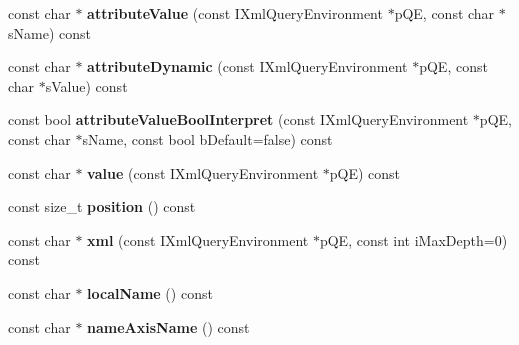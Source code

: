 \begin{DoxyCompactItemize}
\item 
\hypertarget{classgeneral__server_1_1LibXmlBaseNode_a217425847995b514cf153bb48d86d382}{const char $\ast$ {\bfseries attribute\-Value} (const \-I\-Xml\-Query\-Environment $\ast$p\-Q\-E, const char $\ast$s\-Name) const }\label{classgeneral__server_1_1LibXmlBaseNode_a217425847995b514cf153bb48d86d382}

\item 
\hypertarget{classgeneral__server_1_1LibXmlBaseNode_a3825430d31df67a1757812f67c14428a}{const char $\ast$ {\bfseries attribute\-Dynamic} (const \-I\-Xml\-Query\-Environment $\ast$p\-Q\-E, const char $\ast$s\-Value) const }\label{classgeneral__server_1_1LibXmlBaseNode_a3825430d31df67a1757812f67c14428a}

\item 
\hypertarget{classgeneral__server_1_1LibXmlBaseNode_abe06748d4d3333fcbc67fc84e2c77b42}{const bool {\bfseries attribute\-Value\-Bool\-Interpret} (const \-I\-Xml\-Query\-Environment $\ast$p\-Q\-E, const char $\ast$s\-Name, const bool b\-Default=false) const }\label{classgeneral__server_1_1LibXmlBaseNode_abe06748d4d3333fcbc67fc84e2c77b42}

\item 
\hypertarget{classgeneral__server_1_1LibXmlBaseNode_a650ea438a5ca28feca980629f80c4101}{const char $\ast$ {\bfseries value} (const \-I\-Xml\-Query\-Environment $\ast$p\-Q\-E) const }\label{classgeneral__server_1_1LibXmlBaseNode_a650ea438a5ca28feca980629f80c4101}

\item 
\hypertarget{classgeneral__server_1_1LibXmlBaseNode_ae01425edaa378fa7045f8fb9c273f398}{const size\-\_\-t {\bfseries position} () const }\label{classgeneral__server_1_1LibXmlBaseNode_ae01425edaa378fa7045f8fb9c273f398}

\item 
\hypertarget{classgeneral__server_1_1LibXmlBaseNode_ab29b3973a907e524ec705139fb0ecbce}{const char $\ast$ {\bfseries xml} (const \-I\-Xml\-Query\-Environment $\ast$p\-Q\-E, const int i\-Max\-Depth=0) const }\label{classgeneral__server_1_1LibXmlBaseNode_ab29b3973a907e524ec705139fb0ecbce}

\item 
\hypertarget{classgeneral__server_1_1LibXmlBaseNode_abd995c19b7da6f6a28f490c8eec60768}{const char $\ast$ {\bfseries local\-Name} () const }\label{classgeneral__server_1_1LibXmlBaseNode_abd995c19b7da6f6a28f490c8eec60768}

\item 
\hypertarget{classgeneral__server_1_1LibXmlBaseNode_aa7858018fc6286233f6378f3f3890d91}{const char $\ast$ {\bfseries name\-Axis\-Name} () const }\label{classgeneral__server_1_1LibXmlBaseNode_aa7858018fc6286233f6378f3f3890d91}


\end{DoxyCompactItemize}
